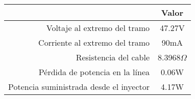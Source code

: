 \begin{tabular}{|r|c|}
  \hline
  \rowcolor[HTML]{E3FFE3} 
  \multicolumn{1}{|c|}{\cellcolor[HTML]{E3FFE3}Parámetro} & Valor      \\ \hline
  Voltaje al extremo del tramo                            & 47.27V     \\ \hline
  Corriente al extremo del tramo                          & 90mA       \\ \hline
  Resistencia del cable                                   & 8.3968$ \Omega $ \\ \hline
  Pérdida de potencia en la línea                         & 0.06W      \\ \hline
  Potencia suministrada desde el inyector                 & 4.17W      \\ \hline
\end{tabular}